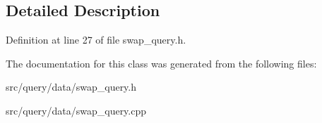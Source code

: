 \subsection{Detailed Description}


Definition at line 27 of file swap\+\_\+query.\+h.



The documentation for this class was generated from the following files\+:\begin{DoxyCompactItemize}
\item 
src/query/data/swap\+\_\+query.\+h\item 
src/query/data/swap\+\_\+query.\+cpp\end{DoxyCompactItemize}
